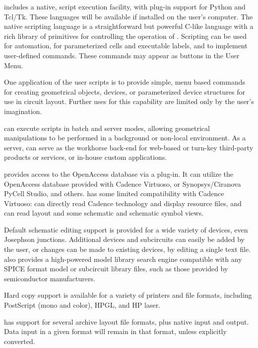{\Xic} includes a native, script execution facility, with plug-in
support for Python and Tcl/Tk.  These languages will be available if
installed on the user's computer.  The native scripting language is a
straightforward but powerful C-like language with a rich library of
primitives for controlling the operation of {\Xic}.  Scripting can be
used for automation, for parameterized cells and executable labels,
and to implement user-defined commands.  These commands may appear as
buttons in the {\cb User Menu}.

One application of the user scripts is to provide simple, menu based
commands for creating geometrical objects, devices, or parameterized
device structures for use in circuit layout.  Further uses for this
capability are limited only by the user's imagination.

{\Xic} can execute scripts in batch and server modes, allowing
geometrical manipulations to be performed in a background or non-local
environment.  As a server, {\Xic} can serve as the workhorse back-end
for web-based or turn-key third-party products or services, or
in-house custom applications.

{\Xic} provides access to the OpenAccess database via a plug-in.  It
can utilize the OpenAccess database provided with Cadence Virtuoso, or
Synopsys/Ciranova PyCell Studio, and others.  {\Xic} has some limited
compatibility with Cadence Virtuoso:  {\Xic} can directly read Cadence
technology and display resource files, and can read layout and some
schematic and schematic symbol views.

Default schematic editing support is provided for a wide variety of
devices, even Josephson junctions.  Additional devices and subcircuits
can easily be added by the user, or changes can be made to existing
devices, by editing a single text file.  {\Xic} also provides a
high-powered model library search engine compatible with any SPICE
format model or subcircuit library files, such as those provided by
semiconductor manufacturers.

Hard copy support is available for a variety of printers and file
formats, including PostScript (mono and color), HPGL, and HP laser. 

{\Xic} has support for several archive layout file formats, plus
native input and output.  Data input in a given format will remain in
that format, unless explicitly converted.

